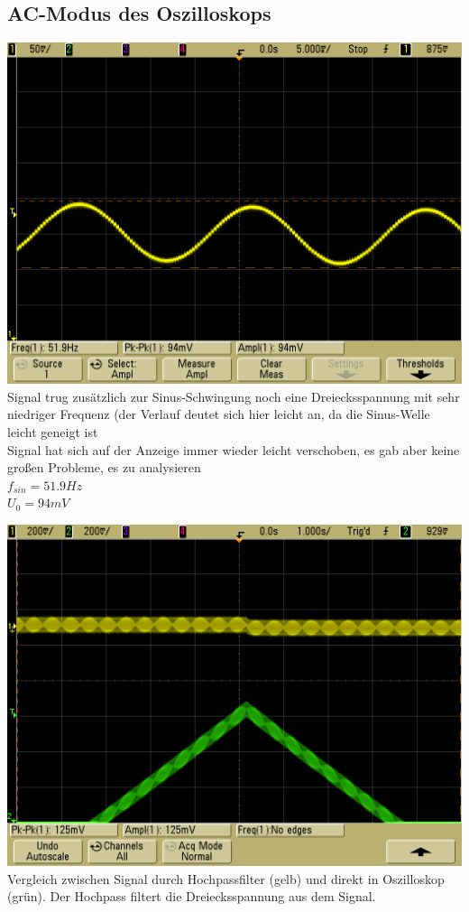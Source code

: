 \documentclass[compress,11pt]{beamer}
\begin{document}
\subsection{AC-Modus des Oszilloskops}
\includegraphics[width=\textwidth]{../daten/scope_16}
Signal trug zusätzlich zur Sinus-Schwingung noch eine Dreiecksspannung mit sehr niedriger Frequenz (der Verlauf deutet sich hier leicht an, da die Sinus-Welle leicht geneigt ist \\
Signal hat sich auf der Anzeige immer wieder leicht verschoben, es gab aber keine großen Probleme, es zu analysieren\\
$f_{sin} = 51.9 Hz$\\
$U_0 = 94 mV$

\includegraphics[width=\textwidth]{../daten/scope_21}
Vergleich zwischen Signal durch Hochpassfilter (gelb) und direkt in Oszilloskop (grün). Der Hochpass filtert die Dreiecksspannung aus dem Signal.
\end{document}
